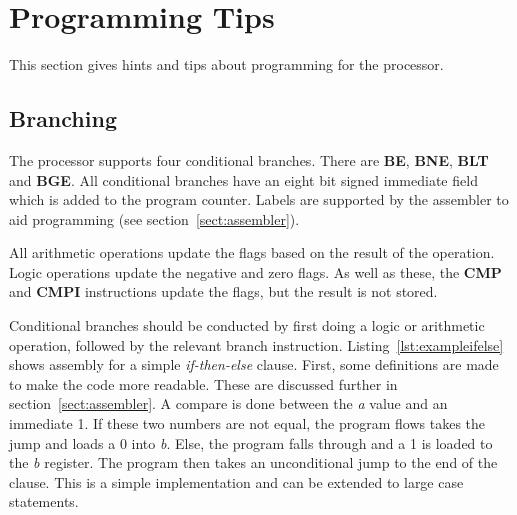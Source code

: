 
\section{Programming Tips}
{}



This section gives hints and tips about programming for the \samurai{} processor. 

\subsection{Branching}

The \samurai{} processor supports four conditional branches. %
There are \textbf{BE}, \textbf{BNE}, \textbf{BLT} and \textbf{BGE}.
All conditional branches have an eight bit signed immediate field which is added to the program counter.
Labels are supported by the assembler to aid programming (see section~\ref{sect:assembler}).

All arithmetic operations update the flags based on the result of the operation. 
Logic operations update the negative and zero flags. 
As well as these, the \textbf{CMP} and \textbf{CMPI} instructions update the flags, but the result is not stored. 

Conditional branches should be conducted by first doing a logic or arithmetic operation, followed by the relevant branch instruction. 
Listing~\ref{lst:exampleifelse} shows assembly for a simple \textit{if-then-else} clause. 
First, some definitions are made to make the code more readable. 
These are discussed further in section~\ref{sect:assembler}.
A compare is done between the \textit{a} value and an immediate 1. 
If these two numbers are not equal, the program flows takes the jump and loads a 0 into \textit{b}.
Else, the program falls through and a 1 is loaded to the \textit{b} register. 
The program then takes an unconditional jump to the end of the clause. 
This is a simple implementation and can be extended to large case statements.

